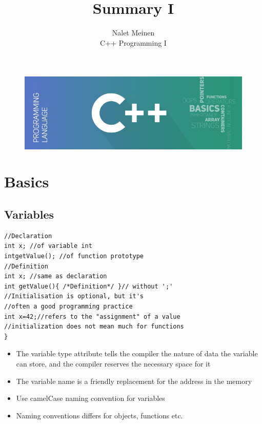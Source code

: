 \documentclass[12pt]{article}
\begin{document}


\title{Summary I}%
\author{Nalet Meinen\\ %
C++ Programming I
}


 


\maketitle


\begin{figure}[!htb]
  \centering
  \vspace*{4cm}
  \includegraphics[width=1.0\linewidth]{pics/title}
\end{figure}

  \pagebreak

\tableofcontents
\pagebreak


\section{Basics}
\subsection{Variables}

\begin{lstlisting}[caption={Declaration, Initialisation and Definition}, style=C++]
//Declaration
int x; //of variable int
intgetValue(); //of function prototype
//Definition
int x; //same as declaration
int getValue(){ /*Definition*/ }// without ';'
//Initialisation is optional, but it's
//often a good programming practice
int x=42;//refers to the "assignment" of a value
//initialization does not mean much for functions
}
\end{lstlisting}
\begin{itemize}
\item The variable type attribute tells the compiler the nature of data the
      variable can store, and the compiler reserves the necessary space for it
\item The variable name is a friendly replacement for the address in the
      memory
\item Use camelCase naming convention for variables
\item Naming conventions differs for objects, functions etc.
\end{itemize}
\end{document}
